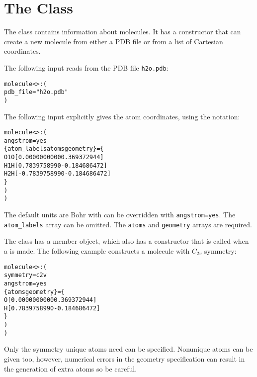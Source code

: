 

\section{The  Class}\label{Molecule}

The  class contains information about molecules.  It has a
 constructor that can create a new molecule from either a
PDB file or from a list of Cartesian coordinates.

The following  input reads from the PDB
file \verb|h2o.pdb|:
\begin{alltt}
molecule<>: (
   pdb_file = "h2o.pdb"
 )
\end{alltt}

The following input explicitly gives the atom coordinates, using the
  notation:
\begin{alltt}
molecule<>: (
    angstrom=yes
    \{ atom_labels atoms           geometry            \} = \{
          O1         O   [ 0.000000000 0  0.369372944 ]
          H1         H   [ 0.783975899 0 -0.184686472 ]
          H2         H   [-0.783975899 0 -0.184686472 ]
     \}
    )
  )
\end{alltt}
The default units are Bohr with can be overridden with
\verb|angstrom=yes|.  The \verb|atom_labels| array can be
omitted.  The \verb|atoms| and \verb|geometry| arrays
are required.

The  class has a 
member object, which also has a  constructor
that is called when a  is made.  The
following example constructs a molecule with $C_{2v}$ symmetry:
\begin{alltt}
molecule<>: (
    symmetry=c2v
    angstrom=yes
    \{ atoms         geometry            \} = \{
        O   [0.000000000 0  0.369372944 ]
        H   [0.783975899 0 -0.184686472 ]
     \}
    )
  )
\end{alltt}
Only the symmetry unique atoms need can be specified.  Nonunique
atoms can be given too, however, numerical errors in the
geometry specification can result in the generation of extra
atoms so be careful.


